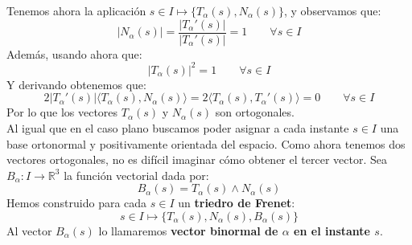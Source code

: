 \noindent
Tenemos ahora la aplicación $s\in I\longmapsto \{T_\alpha(s), N_\alpha(s)\}$, y observamos que:
\begin{equation*}
    |N_\alpha(s)| = \frac{|T_\alpha'(s)|}{|T_\alpha'(s)|} = 1 \qquad \forall s\in I
\end{equation*}
Además, usando ahora que:
\begin{equation*}
    |T_\alpha(s)|^2 = 1 \qquad \forall s\in I
\end{equation*}
Y derivando obtenemos que:
\begin{equation*}
    2|T_\alpha'(s)| \langle T_\alpha(s), N_\alpha(s) \rangle = 2\langle T_\alpha(s),T_\alpha'(s) \rangle  = 0 \qquad \forall s\in I
\end{equation*}
Por lo que los vectores $T_\alpha(s)$ y $N_\alpha(s)$ son ortogonales.\\

\noindent
Al igual que en el caso plano buscamos poder asignar a cada instante $s\in I$ una base ortonormal y positivamente orientada del espacio. Como ahora tenemos dos vectores ortogonales, no es difícil imaginar cómo obtener el tercer vector. Sea $B_\alpha:I\to \mathbb{R}^3$ la función vectorial dada por:
\begin{equation*}
    B_\alpha(s) = T_\alpha(s)\land N_\alpha(s) 
\end{equation*}
Hemos construido para cada $s\in I$ un \textbf{triedro de Frenet}:
\begin{equation*}
    s\in I\longmapsto \{T_\alpha(s), N_\alpha(s), B_\alpha(s)\}
\end{equation*}
Al vector $B_\alpha(s)$ lo llamaremos \textbf{vector binormal de $\alpha$ en el instante $s$}.

